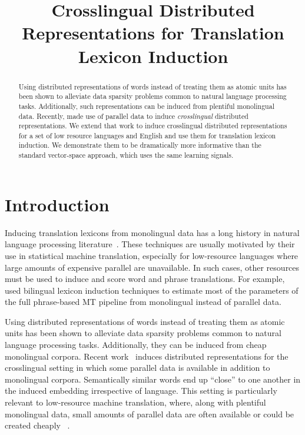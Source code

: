 \documentclass[11pt]{article}
\title{Crosslingual Distributed Representations for Translation Lexicon Induction}
\date{}
\begin{document}
\maketitle
\begin{abstract}
Using distributed representations of words instead of treating them as atomic units has been shown to alleviate data sparsity problems common to natural language processing tasks.  
Additionally, such representations can be induced from plentiful monolingual data.  
Recently,  made use of parallel data to induce {\it crosslingual} distributed representations. %
We extend that work to induce crosslingual distributed representations for a set of low resource languages and English and use them for translation lexicon induction.  
We demonstrate them to be dramatically more informative than the standard vector-space approach, which uses the same learning signals.
\end{abstract}

\section{Introduction} \label{sect:intro}
Inducing translation lexicons from monolingual data has a long history in natural language processing literature~\cite{rapp95,fung98,schafer02,koehn02}.  These techniques are usually motivated by their use in statistical machine translation, especially for low-resource languages where large amounts of expensive parallel are unavailable.
In such cases, other resources must be used to induce and score word and phrase translations.  
For example,  used bilingual lexicon induction techniques to estimate most of the parameters of the full phrase-based MT pipeline \cite{koehn03phrasebased} from monolingual instead of parallel data.

Using distributed representations of words instead of treating them as atomic units has been shown to alleviate data sparsity problems common to natural language processing tasks.  
Additionally, they can be induced from cheap monolingual corpora.  
Recent work~\cite{Klementiev-et-al:COLING2012} induces distributed representations for the crosslingual setting in which some parallel data is available in addition to monolingual corpora.  
Semantically similar words end up ``close'' to one another in the induced embedding irrespective of language.  
This setting is particularly relevant to low-resource machine translation, where, along with plentiful monolingual data, small amounts of parallel data are often available or could be created cheaply ~\cite{post2012}.
\end{document}
